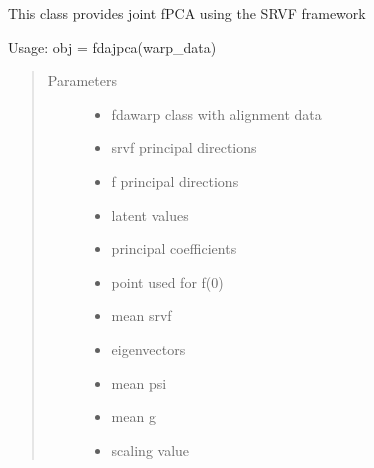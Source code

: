 \documentclass[letterpaper,10pt,english]{sphinxmanual}
\begin{document}

\begin{fulllineitems}
\label{\detokenize{fPCA:fPCA.fdajpca}}
This class provides joint fPCA using the
SRVF framework

Usage:  obj = fdajpca(warp\_data)
\begin{quote}\begin{description}
\item[{Parameters}] \leavevmode\begin{itemize}
\item {} 
 \textendash{} fdawarp class with alignment data

\item {} 
 \textendash{} srvf principal directions

\item {} 
 \textendash{} f principal directions

\item {} 
 \textendash{} latent values

\item {} 
 \textendash{} principal coefficients

\item {} 
 \textendash{} point used for f(0)

\item {} 
 \textendash{} mean srvf

\item {} 
 \textendash{} eigenvectors

\item {} 
 \textendash{} mean psi

\item {} 
 \textendash{} mean g

\item {} 
 \textendash{} scaling value


\end{itemize}
\end{description}
\end{quote}
\end{fulllineitems}
\end{document}
